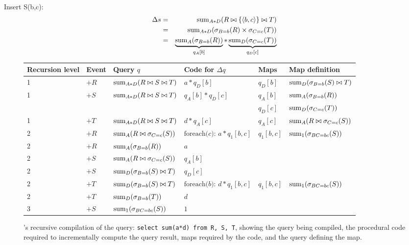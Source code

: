 \smallskip
Insert S(b,c):
\begin{eqnarray*}
\Delta s &=& \mathrm{sum}_{A*D}(R \bowtie \{{\langle b,c\rangle}\} \bowtie T)
\\ &=&
\mathrm{sum}_{A*D}(\sigma_{B=b}(R) \times \sigma_{C=c}(T))
\\ &=&
\underbrace{\mathrm{sum}_{A}(\sigma_{B=b}(R))}_{q_A[b]} *
\underbrace{\mathrm{sum}_{D}(\sigma_{C=c}(T))}_{q_D[c]}
\end{eqnarray*}



\begin{figure*}[tb]
\begin{center}
\begin{tabular}{|l|l|l|l|l|l|}
\hline
Recursion level & Event & Query $q$ & Code for $\Delta q$ & Maps & Map
definition\\
\hline
1 & $+R$ & $\mathrm{sum}_{A*D}(R \bowtie S \bowtie T)$
& $a*q_D[b]$ & $q_D[b]$ & $\mathrm{sum}_{D}(\sigma_{B=b}(S) \bowtie T)$
\\
\hline
1 & $+S$ & $\mathrm{sum}_{A*D}(R \bowtie S \bowtie T)$
& $q_A[b] * q_D[c]$ & $q_A[b]$ & $\mathrm{sum}_{A}(\sigma_{B=b}(R))$
\\
& & & & $q_D[c]$ & $\mathrm{sum}_{D}(\sigma_{C=c}(T))$
\\
\hline
1 & $+T$ & $\mathrm{sum}_{A*D}(R \bowtie S \bowtie T)$
& $d*q_A[c]$ & $q_A[c]$ & $\mathrm{sum}_{A}(R \bowtie \sigma_{C=c}(S))$
\\
\hline
2 & $+R$ & $\mathrm{sum}_{A}(R \bowtie \sigma_{C=c}(S))$
& $\mbox{foreach($c$): } a * q_1[b,c]$ & $q_1[b,c]$ &
$\mathrm{sum}_{1}(\sigma_{BC=bc}(S))$
\\
2 & $+R$ & $\mathrm{sum}_{A}(\sigma_{B=b}(R))$
& $a$ & & \\
\hline
2 & $+S$ & $\mathrm{sum}_{A}(R \bowtie \sigma_{C=c}(S))$
& $q_A[b]$ & & 
\\
2 & $+S$ & $\mathrm{sum}_{D}(\sigma_{B=b}(S) \bowtie T)$
& $q_D[c] $ & & 
\\
\hline
2 & $+T$ & $\mathrm{sum}_{D}(\sigma_{B=b}(S)\bowtie T)$
& $\mbox{foreach($b$): }d * q_1[b,c]$ & $q_1[b,c]$ &
$\mathrm{sum}_{1}(\sigma_{BC=bc}(S))$
\\
2 & $+T$ & $\mathrm{sum}_{D}(\sigma_{B=b}(T))$
& $d$ & & \\
\hline
3 & $+S$ & $\mathrm{sum}_{1}(\sigma_{BC=bc}(S))$
& $1$ & & \\
\hline
\end{tabular}
\end{center}
\label{tab:derivation}
\caption{\compiler's recursive compilation of the query:
\texttt{select sum(a*d) from R, S, T}, showing the query being compiled, the
procedural code required to incrementally compute the query result, maps
required by the code, and the query defining the map.}
\end{figure*}


